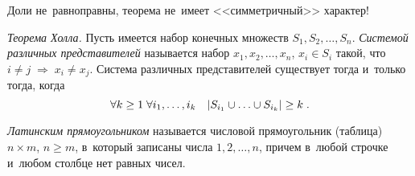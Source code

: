 Доли не~равноправны, теорема не~имеет <<симметричный>> характер!

\begin{problems}

\item\emph{Теорема Холла.}
Пусть имеется набор конечных множеств $S_1, S_2, \ldots, S_n$.
\emph{Системой различных представителей} называется набор
$x_1, x_2, \ldots, x_n$, $x_i \in S_i$ такой, что
\(
    i \neq j
\;\Rightarrow\;
    x_i \neq x_j
\).
Система различных представителей существует тогда и~только тогда, когда
\[
    \forall k \geq 1
\;
    \forall i_1, \ldots, i_k
\quad
    \lvert S_{i_1} \cup \ldots \cup S_{i_k} \rvert \geq k
\;.\]

\end{problems}

\emph{Латинским прямоугольником} называется числовой прямоугольник (таблица)
$n \times m$, $n \geq m$, в~который записаны числа $1, 2, \ldots, n$, причем
в~любой строчке и~любом столбце нет равных чисел.

